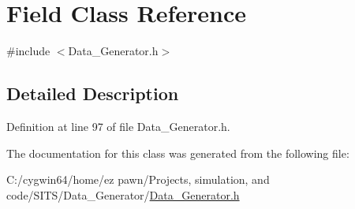 \hypertarget{class_field}{}\section{Field Class Reference}
\label{class_field}


{\ttfamily \#include $<$Data\+\_\+\+Generator.\+h$>$}



\subsection{Detailed Description}


Definition at line 97 of file Data\+\_\+\+Generator.\+h.



The documentation for this class was generated from the following file\+:\begin{DoxyCompactItemize}
\item 
C\+:/cygwin64/home/ez pawn/\+Projects, simulation, and code/\+S\+I\+T\+S/\+Data\+\_\+\+Generator/\hyperlink{_data___generator_8h}{Data\+\_\+\+Generator.\+h}\end{DoxyCompactItemize}
